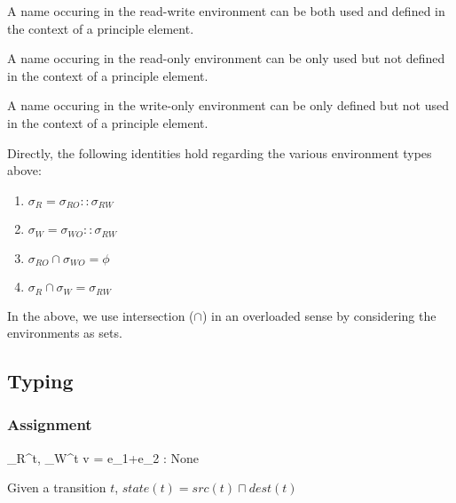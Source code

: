 \documentclass[12pt,a4paper]{article}
\begin{document}
\begin{definition}
	A name occuring in the read-write environment can be both used and defined in the context of a principle element. 
\end{definition}


\begin{definition}
	A name occuring in the read-only environment can be only used but not defined in the context of a principle element. 
\end{definition}


\begin{definition}
	A name occuring in the write-only environment can be only defined but not used in the context of a principle element. 
\end{definition}

Directly, the following identities hold regarding the various environment types above:
\begin{enumerate}
	\item $\sigma_R = \sigma_{RO} :: \sigma_{RW}$
	\item $\sigma_W = \sigma_{WO} :: \sigma_{RW}$
	\item $\sigma_{RO} \cap \sigma_{WO} = \phi$
	\item $\sigma_{R} \cap \sigma_{W} = \sigma_{RW}$
\end{enumerate}

In the above, we use intersection ($\cap$) in an overloaded sense by considering the environments as sets.


\subsection{Typing}

\subsubsection{Assignment}
{\sigma_R^t, \sigma_W^t \vdash v = e_1+e_2 : None}

\vspace{1cm}
\begin{myrule} \label{r:tp}
	Given a transition $t$, $state(t) = src(t) \sqcap dest(t)$ 
\end{myrule}
\end{document}
